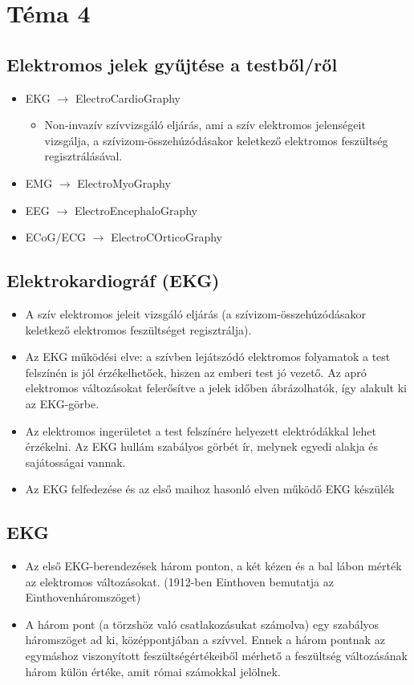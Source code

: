﻿\section{Téma 4}

\subsection{Elektromos jelek gyűjtése a testből/ről}
\begin{itemize}
    \item EKG $\rightarrow$ ElectroCardioGraphy
    \begin{itemize}
        \item Non-invazív szívvizsgáló eljárás, ami a szív elektromos jelenségeit vizsgálja, a szívizom-összehúzódásakor keletkező elektromos feszültség regisztrálásával.
    \end{itemize}
    \item EMG $\rightarrow$ ElectroMyoGraphy
    \item EEG $\rightarrow$ ElectroEncephaloGraphy
    \item ECoG/ECG $\rightarrow$ ElectroCOrticoGraphy
\end{itemize}

\subsection{Elektrokardiográf (EKG)}
\begin{itemize}
    \item A szív elektromos jeleit vizsgáló eljárás (a szívizom-összehúzódásakor
    keletkező elektromos feszültséget regisztrálja).
    \item Az EKG működési elve: a szívben lejátszódó elektromos folyamatok a
    test felszínén is jól érzékelhetőek, hiszen az emberi test jó vezető. Az
    apró elektromos változásokat felerősítve a jelek időben ábrázolhatók,
    így alakult ki az EKG-görbe.
    \item Az elektromos ingerületet a test felszínére helyezett elektródákkal
    lehet érzékelni. Az EKG hullám szabályos görbét ír, melynek egyedi
    alakja és sajátosságai vannak.
    \item Az EKG felfedezése és az első maihoz hasonló elven működő EKG
    készülék
\end{itemize}

\clearpage
\subsection{EKG}
\begin{itemize}
    \item Az első EKG-berendezések három ponton, a két kézen
    és a bal lábon mérték az elektromos változásokat.
    (1912-ben Einthoven bemutatja az Einthovenháromszöget)
    \item A három pont (a törzshöz való csatlakozásukat
    számolva) egy szabályos háromszöget ad ki,
    középpontjában a szívvel. Ennek a három pontnak az
    egymáshoz viszonyított feszültségértékeiből mérhető a
    feszültség változásának három külön értéke, amit
    római számokkal jelölnek.
\end{itemize}

